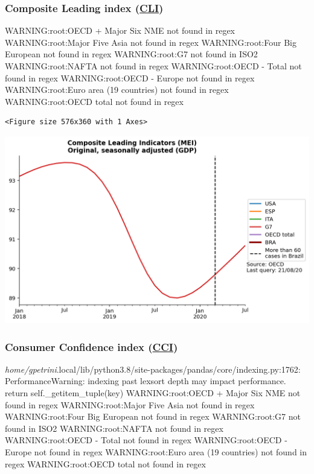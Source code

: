 \documentclass[11pt]{article}
\begin{document}
\subsubsection{Composite Leading index (\href{https://stats.oecd.org/Index.aspx?DataSetCode=MEI\_CLI}{CLI})}
\label{sec:org32696df}

WARNING:root:OECD + Major Six NME not found in regex
WARNING:root:Major Five Asia not found in regex
WARNING:root:Four Big European not found in regex
WARNING:root:G7 not found in ISO2
WARNING:root:NAFTA not found in regex
WARNING:root:OECD - Total not found in regex
WARNING:root:OECD - Europe not found in regex
WARNING:root:Euro area (19 countries) not found in regex
WARNING:root:OECD total  not found in regex

\begin{verbatim}
<Figure size 576x360 with 1 Axes>
\end{verbatim}


\begin{center}
\includegraphics[width=.9\linewidth]{obipy-resources/62e383af79e91b63c7fc98dd7fb55b3c3ececcb9/9bcf6d9f78953ccf19a8f910062819f29e1f69ea.png}
\end{center}


\subsubsection{Consumer Confidence index (\href{https://stats.oecd.org/Index.aspx?DataSetCode=MEI\_CCI}{CCI})}
\label{sec:orgf957ce0}

\emph{home/gpetrini}.local/lib/python3.8/site-packages/pandas/core/indexing.py:1762: PerformanceWarning: indexing past lexsort depth may impact performance.
  return self.\_getitem\_tuple(key)
WARNING:root:OECD + Major Six NME not found in regex
WARNING:root:Major Five Asia not found in regex
WARNING:root:Four Big European not found in regex
WARNING:root:G7 not found in ISO2
WARNING:root:NAFTA not found in regex
WARNING:root:OECD - Total not found in regex
WARNING:root:OECD - Europe not found in regex
WARNING:root:Euro area (19 countries) not found in regex
WARNING:root:OECD total  not found in regex
\end{document}
